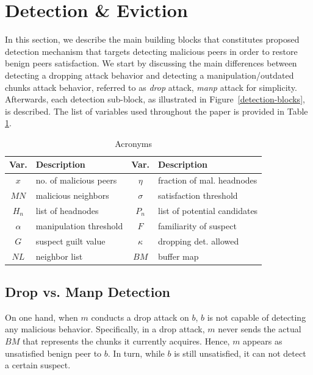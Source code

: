 \section{Detection \& Eviction}
\label{sec:detection}

In this section, we describe the main building blocks that constitutes proposed detection mechanism that targets detecting malicious peers in order to restore benign peers satisfaction.
We start by discussing the main differences between detecting a dropping attack behavior and detecting a manipulation/outdated chunks attack behavior, referred to as \textit{drop} attack, \textit{manp} attack for simplicity.
Afterwards, each detection sub-block, as illustrated in Figure~\ref{detection-blocks}, is described.
The list of variables used throughout the paper is provided in Table \ref{tab:acronyms}.

\begin{table}[ht]
\center
\caption{Acronyms}
\begin{tabular}{|c|l||c|l|}
\hline

\bf{Var.} & \bf{Description}  & \bf{Var.} & \bf{Description} \\\hline\hline
$x$ & no. of malicious peers & $\eta$ & fraction of mal. headnodes\\\hline
$MN$ & malicious neighbors & $\sigma$ & satisfaction threshold\\\hline
$H_n$ & list of headnodes & $P_n$ & list of potential candidates \\\hline
$\alpha$ & manipulation threshold& $F$ & familiarity of suspect \\\hline
$G$ & suspect guilt value & $\kappa$ & dropping det. allowed\\\hline
$NL$ & neighbor list & $BM$ & buffer map\\\hline
\end{tabular}
\label{tab:acronyms}
\end{table}

\subsection{Drop vs. Manp Detection}
On one hand, when $m$ conducts a drop attack on $b$, $b$ is not capable of detecting any malicious behavior.
Specifically, in a drop attack, $m$ never sends the actual $BM$ that represents the chunks it currently acquires.
Hence, $m$ appears as unsatisfied benign peer to $b$.
In turn, while $b$ is still unsatisfied, it can not detect a certain suspect. 

